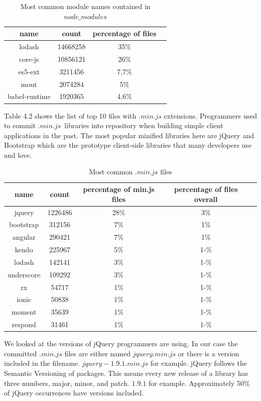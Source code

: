 \documentclass[thesis=M,english]{FITthesis}[2012/10/20]
\begin{document}
\begin{table}[h]
\centering
\begin{tabular}{@{}cccc@{}}
name & count & percentage of files &    \\ \midrule
lodash & 14668258 & 35\% &\\
core-js & 10856121 &  26\% &\\
es5-ext & 3211456 & 7,7\%  &\\
mout & 2074284 & 5\% &\\
babel-runtime & 1920365 & 4,6\% &\\
\bottomrule
\end{tabular}
\caption{Most common module names contained in $node\_modules$}
\label{node_modules}
\end{table}

Table 4.2 shows the list of top 10 files with $.min.js$ extensions. Programmers used to commit $.min.js$ libraries into repository when building simple client applications in the past. The most popular minified libraries here are jQuery and Bootstrap which are the prototype client-side libraries that many developers use and love.

\begin{table}[h]
\centering
\begin{tabular}{@{}ccccc@{}}
name & count & percentage of min.js files & percentage of files overall &   \\ \midrule
jquery & 1226486  & 28\%   & 3\% &\\
bootstrap & 312156  & 7\% & 1\% &\\
angular &  290421 & 7\% & 1\%&\\
kendo & 225967 & 5\% & 1-\% &\\
lodash & 142141  & 3\% & 1-\% &\\
underscore & 109292 & 3\%& 1-\% &\\
rx & 54717  &  1\%& 1-\% &\\
ionic &  50838 &  1\%& 1-\% &\\
moment & 35639  & 1\% & 1-\% &\\
respond & 31461  &  1\% & 1-\% &\\
\bottomrule
\end{tabular}
\caption{Most common $.min.js$ files}
\label{minified_files}
\end{table}

\newpage

We looked at the versions of jQuery programmers are using. In our case the committed $.min.js$ files are either named $jquery.min.js$ or there is a version included in the filename. $jquery-1.9.1.min.js$ for example. jQuery follows the Semantic Versioning of packages. This means every new release of a library has three numbers, major, minor, and patch. $1.9.1$ for example. Approximately 50\% of jQuery occurrences have versions included. \\
\end{document}

